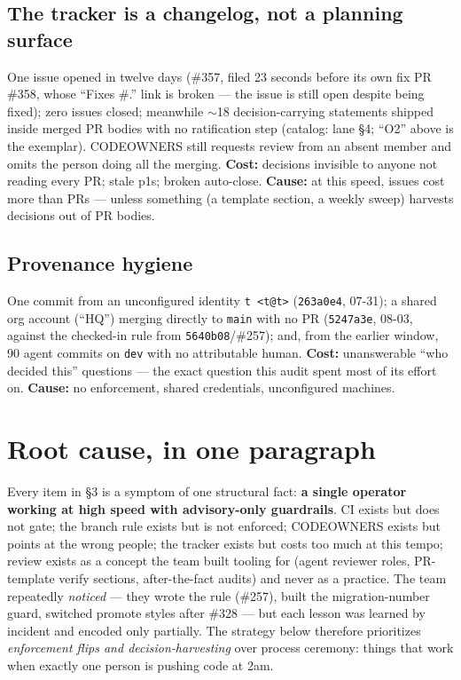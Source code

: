 \documentclass[10pt]{article}
\newcommand{\gh}[1]{\mbox{\##1}}
\begin{document}
\subsection{The tracker is a changelog, not a planning surface}
One issue opened in twelve days (\gh{357}, filed 23 seconds before its own fix PR \gh{358}, whose ``Fixes \#.'' link is broken --- the issue is still open despite being fixed); zero issues closed; meanwhile $\sim$18 decision-carrying statements shipped inside merged PR bodies with no ratification step (catalog: lane  \S4; ``O2'' above is the exemplar). CODEOWNERS still requests review from an absent member and omits the person doing all the merging. \textbf{Cost:} decisions invisible to anyone not reading every PR; stale p1s; broken auto-close. \textbf{Cause:} at this speed, issues cost more than PRs --- unless something (a template section, a weekly sweep) harvests decisions out of PR bodies.

\subsection{Provenance hygiene}
One commit from an unconfigured identity \texttt{t <t@t>} (\texttt{263a0e4}, 07-31); a shared org account (``HQ'') merging directly to \texttt{main} with no PR (\texttt{5247a3e}, 08-03, against the checked-in rule from \texttt{5640b08}/\gh{257}); and, from the earlier window, 90 agent commits on \texttt{dev} with no attributable human. \textbf{Cost:} unanswerable ``who decided this'' questions --- the exact question this audit spent most of its effort on. \textbf{Cause:} no enforcement, shared credentials, unconfigured machines.

\section{Root cause, in one paragraph}
Every item in \S3 is a symptom of one structural fact: \textbf{a single operator working at high speed with advisory-only guardrails}. CI exists but does not gate; the branch rule exists but is not enforced; CODEOWNERS exists but points at the wrong people; the tracker exists but costs too much at this tempo; review exists as a concept the team built tooling for (agent reviewer roles, PR-template verify sections, after-the-fact audits) and never as a practice. The team repeatedly \emph{noticed} --- they wrote the rule (\gh{257}), built the migration-number guard, switched promote styles after \gh{328} --- but each lesson was learned by incident and encoded only partially. The strategy below therefore prioritizes \emph{enforcement flips and decision-harvesting} over process ceremony: things that work when exactly one person is pushing code at 2am.
\end{document}
